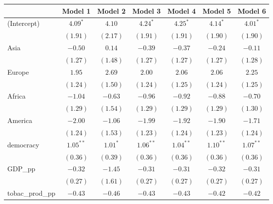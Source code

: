 
\begin{table}[!h]
\begin{center}
\begin{tabular}{l c c c c c c }
\toprule
 & Model 1 & Model 2 & Model 3 & Model 4 & Model 5 & Model 6 \\
\midrule
(Intercept)             & $4.09^{*}$   & $4.10$       & $4.24^{*}$   & $4.25^{*}$   & $4.14^{*}$   & $4.01^{*}$   \\
                        & $(1.91)$     & $(2.17)$     & $(1.91)$     & $(1.91)$     & $(1.90)$     & $(1.90)$     \\
Asia                    & $-0.50$      & $0.14$       & $-0.39$      & $-0.37$      & $-0.24$      & $-0.11$      \\
                        & $(1.27)$     & $(1.48)$     & $(1.27)$     & $(1.27)$     & $(1.27)$     & $(1.28)$     \\
Europe                  & $1.95$       & $2.69$       & $2.00$       & $2.06$       & $2.06$       & $2.25$       \\
                        & $(1.24)$     & $(1.50)$     & $(1.24)$     & $(1.25)$     & $(1.24)$     & $(1.25)$     \\
Africa                  & $-1.04$      & $-0.63$      & $-0.96$      & $-0.92$      & $-0.88$      & $-0.70$      \\
                        & $(1.29)$     & $(1.54)$     & $(1.29)$     & $(1.29)$     & $(1.29)$     & $(1.30)$     \\
America                 & $-2.00$      & $-1.06$      & $-1.99$      & $-1.92$      & $-1.90$      & $-1.71$      \\
                        & $(1.24)$     & $(1.53)$     & $(1.23)$     & $(1.24)$     & $(1.23)$     & $(1.24)$     \\
democracy               & $1.05^{**}$  & $1.01^{*}$   & $1.06^{**}$  & $1.04^{**}$  & $1.10^{**}$  & $1.07^{**}$  \\
                        & $(0.36)$     & $(0.39)$     & $(0.36)$     & $(0.36)$     & $(0.36)$     & $(0.36)$     \\
GDP\_pp                 & $-0.32$      & $-1.45$      & $-0.31$      & $-0.31$      & $-0.32$      & $-0.31$      \\
                        & $(0.27)$     & $(1.61)$     & $(0.27)$     & $(0.27)$     & $(0.27)$     & $(0.27)$     \\
tobac\_prod\_pp         & $-0.43$      & $-0.46$      & $-0.43$      & $-0.43$      & $-0.42$      & $-0.42$      \\

\end{tabular}
\end{center}
\end{table}
